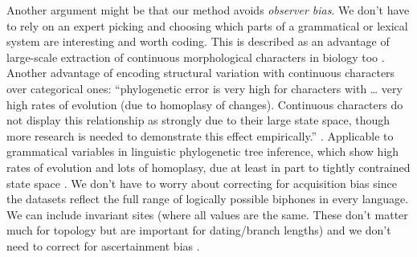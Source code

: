 Another argument might be that our method avoids \emph{observer bias}. We don't have to rely on an expert picking and choosing which parts of a grammatical or lexical system are interesting and worth coding. This is described as an advantage of large-scale extraction of continuous morphological characters in biology too \autocite{wright_systematists_2019}. Another advantage of encoding structural variation with continuous characters over categorical ones: ``phylogenetic error is very high for characters with \ldots{} very high rates of evolution (due to homoplasy of changes). Continuous characters do not display this relationship as strongly due to their large state space, though more research is needed to demonstrate this effect empirically.'' \autocite{wright_bayesian_2014}. Applicable to grammatical variables in linguistic phylogenetic tree inference, which show high rates of evolution and lots of homoplasy, due at least in part to tightly contrained state space \autocite{greenhill_evolutionary_2017}. We don't have to worry about correcting for acquisition bias since the datasets reflect the full range of logically possible biphones in every language. We can include invariant sites (where all values are the same. These don't matter much for topology but are important for dating/branch lengths) and we don't need to correct for ascertainment bias \autocite{leache_short_2015}.

